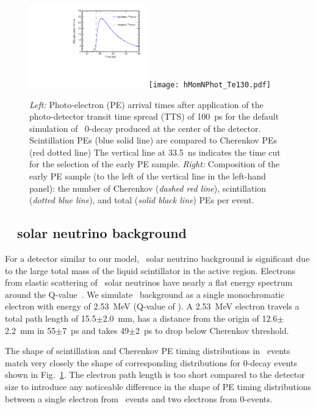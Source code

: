 \begin{figure}[ht]
  \centering
  \includegraphics[width=0.45\textwidth]{hT_Te130_v2.pdf}
\hfil
  \texttt{[image: hMomNPhot\_Te130.pdf]}
  \caption{\emph{Left:} Photo-electron (PE) arrival times after
    application of the photo-detector transit time spread (TTS) of
    100~ps for the default simulation of \Te~0\nbb-decay produced at
    the center of the detector.  Scintillation PEs (blue solid line)
    are compared to Cherenkov PEs (red dotted line) The vertical line
    at 33.5~ns indicates the time cut for the selection of the early
    PE sample.  \emph{Right:} Composition of the early PE sample (to
    the left of the vertical line in the left-hand panel):
    the number of Cherenkov (\emph{dashed red line}), scintillation
    (\emph{dotted blue line}), and total (\emph{solid black line}) PEs
    per event.}
\label{fig:ArrivalTimeDist}
\end{figure}


\subsection{\B~ solar neutrino background}

For a detector similar to our model, \B~solar neutrino background is
significant due to the large total mass of the liquid scintillator in the
active region.  Electrons from elastic scattering of \B~solar
neutrinos have nearly a flat energy spectrum around the
Q-value~\cite{SNOp-B8-bkg}. We simulate \B~background as a single
monochromatic electron with energy of 2.53~MeV (Q-value of \Te). A
2.53~MeV electron travels a total path length of 15.5$\pm$2.0~mm, has
a distance from the origin of 12.6$\pm$2.2~mm in 55$\pm$7~ps and
takes 49$\pm$2~ps to drop below Cherenkov threshold.

The shape of scintillation and Cherenkov PE timing distributions in
\B~events match very closely the shape of corresponding distributions
for 0\nbb-decay events shown in Fig.~\ref{fig:ArrivalTimeDist}. The
electron path length is too short compared to the detector size to
introduce any noticeable difference in the shape of PE timing
distributions between a single electron from \B~events and two
electrons from 0\nbb-events. 

